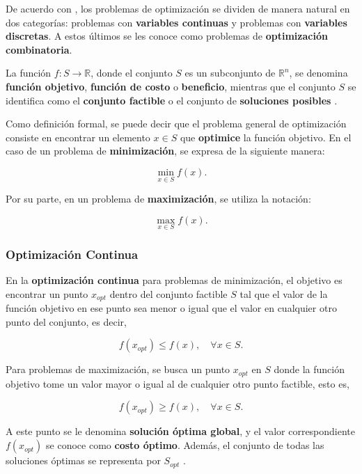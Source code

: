 \documentclass[12pt,titlepage,twoside,openright]{book}
\begin{document}
De acuerdo con \citep{cobos2010}, los problemas de optimización se dividen de manera natural en dos categorías: problemas con \textbf{variables continuas} y problemas con \textbf{variables discretas}. A estos últimos se les conoce como problemas de \textbf{optimización combinatoria}.

La función \(f : S \to \mathbb{R}\), donde el conjunto \(S\) es un subconjunto de \(\mathbb{R}^n\), se denomina \textbf{función objetivo}, \textbf{función de costo} o \textbf{beneficio}, mientras que el conjunto \(S\) se identifica como el \textbf{conjunto factible} o el conjunto de \textbf{soluciones posibles} \citep{cobos2010}.

Como definición formal, se puede decir que el problema general de optimización consiste en encontrar un elemento \(x \in S\) que \textbf{optimice} la función objetivo. En el caso de un problema de \textbf{minimización}, se expresa de la siguiente manera:

\[
	\min_{x \in S} f(x).
\]

Por su parte, en un problema de \textbf{maximización}, se utiliza la notación:

\[
	\max_{x \in S} f(x).
\]

\citep{cobos2010}



\subsubsection{Optimización Continua}

En la \textbf{optimización continua} para problemas de minimización, el objetivo es encontrar un punto \( x_{opt} \) dentro del conjunto factible \( S \) tal que el valor de la función objetivo en ese punto sea menor o igual que el valor en cualquier otro punto del conjunto, es decir,

\[
	f(x_{opt}) \leq f(x), \quad \forall x \in S.
\]

Para problemas de maximización, se busca un punto \( x_{opt} \) en \( S \) donde la función objetivo tome un valor mayor o igual al de cualquier otro punto factible, esto es,

\[
	f(x_{opt}) \geq f(x), \quad \forall x \in S.
\]

A este punto se le denomina \textbf{solución óptima global}, y el valor correspondiente \( f(x_{opt}) \) se conoce como \textbf{costo óptimo}. Además, el conjunto de todas las soluciones óptimas se representa por \( S_{opt} \) \citep{cobos2010}.
\end{document}
